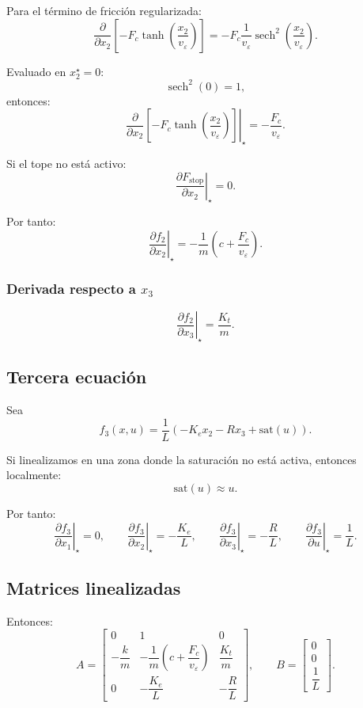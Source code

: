 \documentclass[11pt]{article}
\begin{document}
Para el t\'ermino de fricci\'on regularizada:
\[
\frac{\partial}{\partial x_2}
\left[-F_c\tanh\left(\frac{x_2}{v_\varepsilon}\right)\right]
=
-F_c\frac{1}{v_\varepsilon}\operatorname{sech}^2\left(\frac{x_2}{v_\varepsilon}\right).
\]

Evaluado en $x_2^\star=0$:
\[
\operatorname{sech}^2(0)=1,
\]
entonces:
\[
\left.\frac{\partial}{\partial x_2}
\left[-F_c\tanh\left(\frac{x_2}{v_\varepsilon}\right)\right]\right|_\star
=
-\frac{F_c}{v_\varepsilon}.
\]

Si el tope no est\'a activo:
\[
\left.\frac{\partial F_{\text{stop}}}{\partial x_2}\right|_\star=0.
\]

Por tanto:
\begin{equation}
\left.\frac{\partial f_2}{\partial x_2}\right|_\star
=
-\frac{1}{m}\left(c+\frac{F_c}{v_\varepsilon}\right).
\end{equation}

\subsubsection{Derivada respecto a $x_3$}

\[
\left.\frac{\partial f_2}{\partial x_3}\right|_\star = \frac{K_t}{m}.
\]

\subsection{Tercera ecuaci\'on}

Sea
\[
f_3(x,u)=\frac{1}{L}\left(-K_e x_2 - Rx_3 + \mathrm{sat}(u)\right).
\]

Si linealizamos en una zona donde la saturaci\'on no est\'a activa, entonces localmente:
\[
\mathrm{sat}(u)\approx u.
\]

Por tanto:
\[
\left.\frac{\partial f_3}{\partial x_1}\right|_\star = 0,
\qquad
\left.\frac{\partial f_3}{\partial x_2}\right|_\star = -\frac{K_e}{L},
\qquad
\left.\frac{\partial f_3}{\partial x_3}\right|_\star = -\frac{R}{L},
\qquad
\left.\frac{\partial f_3}{\partial u}\right|_\star = \frac{1}{L}.
\]

\subsection{Matrices linealizadas}

Entonces:
\begin{equation}
A=
\begin{bmatrix}
0 & 1 & 0\\[4pt]
-\dfrac{k}{m} & -\dfrac{1}{m}\left(c+\dfrac{F_c}{v_\varepsilon}\right) & \dfrac{K_t}{m}\\[8pt]
0 & -\dfrac{K_e}{L} & -\dfrac{R}{L}
\end{bmatrix},
\qquad
B=
\begin{bmatrix}
0\\
0\\
\dfrac{1}{L}
\end{bmatrix}.
\label{eq:AB_lin}
\end{equation}
\end{document}
